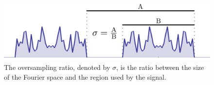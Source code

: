 \begin{figure}[h]
  \centering
  \includegraphics[width=0.8 \columnwidth]{Fourier_Theory/Oversampling.png}
 \caption{The oversampling ratio, denoted by $\sigma$, is the ratio between the
    size of the Fourier space and the region used by the signal.}
  \label{Fig:OversamplingRatio}

\end{figure}
